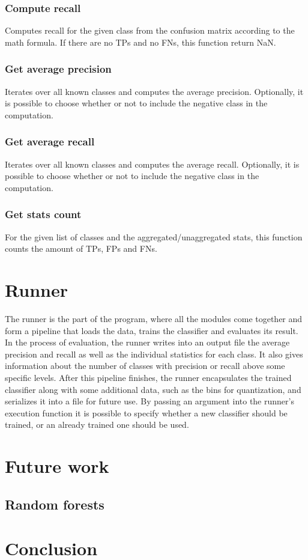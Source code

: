 \documentclass{article}
\begin{document}
      \subsubsection{Compute recall}
        Computes recall for the given class from the confusion matrix according to the math formula. If there are no TPs and no FNs, this function return NaN.
      \subsubsection{Get average precision}
        Iterates over all known classes and computes the average precision. Optionally, it is possible to choose whether or not to include the negative class in the computation.
      \subsubsection{Get average recall}
        Iterates over all known classes and computes the average recall. Optionally, it is possible to choose whether or not to include the negative class in the computation.
      \subsubsection{Get stats count}
        For the given list of classes and the aggregated/unaggregated stats, this function counts the amount of TPs, FPs and FNs.
    \newpage
  \section{Runner}
    The runner is the part of the program, where all the modules come together and form a pipeline that loads the data, trains the classifier and evaluates its result. In the process of evaluation, the runner writes into an output file the average precision and recall as well as the individual statistics for each class. It also gives information about the number of classes with precision or recall above some specific levels. After this pipeline finishes, the runner encapsulates the trained classifier along with some additional data, such as the bins for quantization, and serializes it into a file for future use. By passing an argument into the runner's execution function it is possible to specify whether a new classifier should be trained, or an already trained one should be used.
  \newpage
  \section{Future work}
    \subsection{Random forests}
    \newpage
  \section*{Conclusion}
\end{document}
